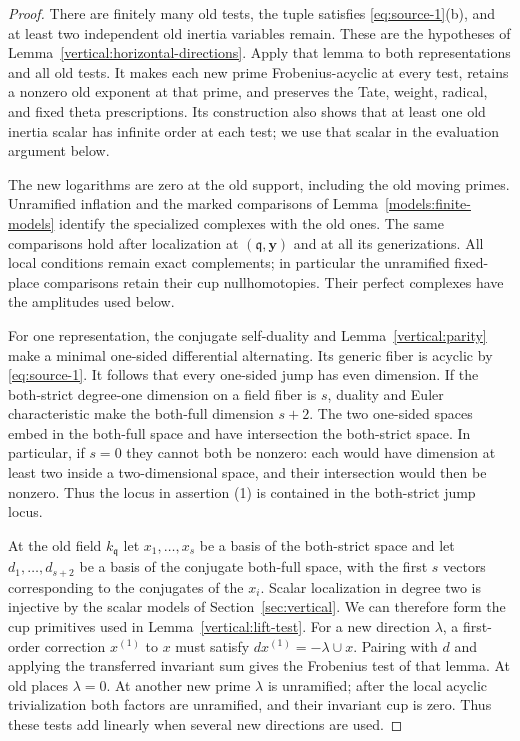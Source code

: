 \begin{proof}
There are finitely many old tests, the tuple satisfies
\eqref{eq:source-1}(b), and at least two independent old inertia
variables remain.  These are the hypotheses of
Lemma~\ref{vertical:horizontal-directions}.  Apply that lemma to
both representations and all old tests.  It makes each new prime
Frobenius-acyclic at every test, retains a nonzero old exponent at
that prime, and preserves the Tate, weight, radical, and fixed
theta prescriptions.  Its construction also shows that at least
one old inertia scalar has infinite order at each test; we use
that scalar in the evaluation argument below.

The new logarithms are zero at the old support, including the old
moving primes.  Unramified inflation and the marked comparisons
of Lemma~\ref{models:finite-models} identify the specialized
complexes with the old ones.  The same comparisons hold after
localization at $(\mathfrak q,\mathbf y)$ and at all its
generizations.  All local conditions remain exact complements;
in particular the unramified fixed-place comparisons retain
their cup nullhomotopies.  Their perfect complexes have the
amplitudes used below.

For one representation, the conjugate self-duality and
Lemma~\ref{vertical:parity} make a minimal one-sided differential
alternating.  Its generic fiber is acyclic by
\eqref{eq:source-1}.  It follows that every one-sided jump has even
dimension.  If the both-strict degree-one dimension on a field
fiber is $s$, duality and Euler characteristic make the both-full
dimension $s+2$.  The two one-sided spaces embed in the both-full
space and have intersection the both-strict space.  In particular,
if $s=0$ they cannot both be nonzero: each would have dimension at
least two inside a two-dimensional space, and their intersection
would then be nonzero.  Thus the locus in assertion (1) is
contained in the both-strict jump locus.

At the old field $k_{\mathfrak q}$ let $x_1,\ldots,x_s$ be a basis
of the both-strict space and let $d_1,\ldots,d_{s+2}$ be a basis
of the conjugate both-full space, with the first $s$ vectors
corresponding to the conjugates of the $x_i$.  Scalar localization
in degree two is injective by the scalar models of
Section~\ref{sec:vertical}.  We can therefore form the cup
primitives used in Lemma~\ref{vertical:lift-test}.  For a new
direction $\lambda$, a first-order correction $x^{(1)}$ to $x$ must
satisfy $dx^{(1)}=-\lambda\cup x$.  Pairing with $d$ and applying the
transferred invariant sum gives the Frobenius test of that lemma.
At old places $\lambda=0$.  At another new prime $\lambda$ is
unramified; after the local acyclic trivialization both factors
are unramified, and their invariant cup is zero.  Thus these tests
add linearly when several new directions are used.


\end{proof}
